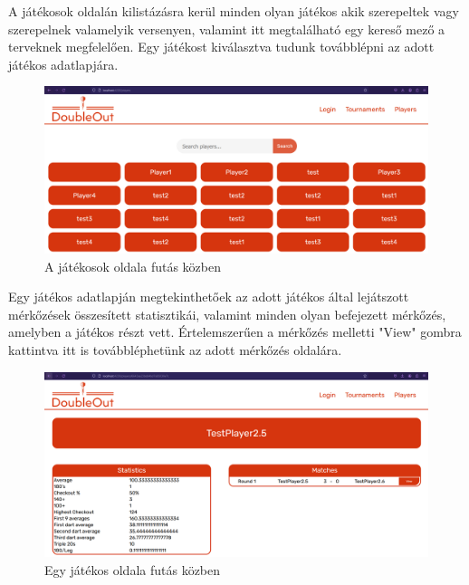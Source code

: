 A játékosok oldalán kilistázásra kerül minden olyan játékos akik szerepeltek vagy szerepelnek valamelyik versenyen, valamint itt megtalálható egy kereső mező a terveknek megfelelően. Egy játékost kiválasztva tudunk továbblépni az adott játékos adatlapjára. 

\begin{figure}[h]
\centering
\includegraphics[scale=0.3]{images/PlayersTest.png}
\caption{A játékosok oldala futás közben}
\label{fig:playersTest}
\end{figure}

Egy játékos adatlapján megtekinthetőek az adott játékos által lejátszott mérkőzések összesített statisztikái, valamint minden olyan befejezett mérkőzés, amelyben a játékos részt vett. Értelemszerűen a mérkőzés melletti "View" gombra kattintva itt is továbbléphetünk az adott mérkőzés oldalára.

\begin{figure}[h]
\centering
\includegraphics[scale=0.3]{images/PlayerTest.png}
\caption{Egy játékos oldala futás közben}
\label{fig:playerTest}
\end{figure}